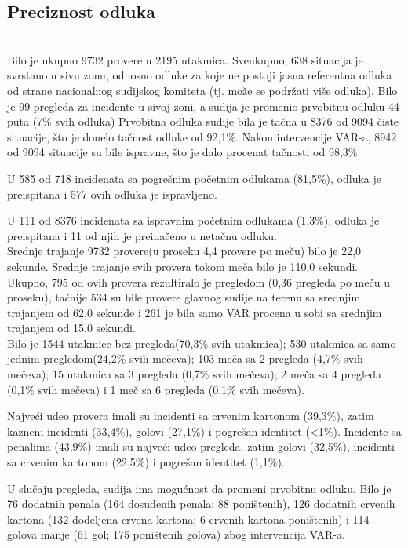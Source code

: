\documentclass[a4paper]{article}
\begin{document}
\subsection{Preciznost odluka} \\

Bilo je ukupno 9732 provere u 2195 utakmica. Sveukupno, 638 situacija je svrstano u sivu zonu, odnosno odluke za koje ne postoji jasna referentna odluka od strane nacionalnog sudijskog komiteta (tj. može se podržati više odluka). Bilo je 99 pregleda za incidente u sivoj zoni, a sudija je promenio prvobitnu odluku 44 puta (7\% svih odluka)
Prvobitna odluka sudije bila je tačna u 8376 od 9094 čiste situacije, što je donelo tačnost odluke od 92,1\%. Nakon intervencije VAR-a, 8942 od 9094 situacije su bile ispravne, što je dalo procenat tačnosti od 98,3\%.  

U 585 od 718 incidenata sa pogrešnim početnim odlukama (81,5\%), odluka je preispitana i 577 ovih odluka je ispravljeno. 

U 111 od 8376 incidenata sa ispravnim početnim odlukama (1,3\%), odluka je preispitana i 11 od njih je preinačeno u netačnu odluku. \\

Srednje trajanje 9732 provere(u proseku 4,4 provere po meču) bilo je 22,0 sekunde. Srednje trajanje svih provera tokom meča bilo je 110,0 sekundi. 
Ukupno, 795 od ovih provera rezultiralo je pregledom (0,36 pregleda po meču u proseku), tačnije 534 su bile provere glavnog sudije na terenu sa srednjim trajanjem od 62,0 sekunde i 261 je bila samo VAR procena u sobi sa srednjim trajanjem od 15,0 sekundi. \\

Bilo je 1544 utakmice bez pregleda(70,3\% svih utakmica); 530 utakmica sa samo jednim pregledom(24,2\% svih mečeva); 103 meča sa 2 pregleda (4,7\% svih mečeva); 15 utakmica sa 3 pregleda (0,7\% svih mečeva); 2 meča sa 4 pregleda (0,1\% svih mečeva) i 1 meč sa 6 pregleda (0,1\% svih mečeva).

Najveći udeo provera imali su incidenti sa crvenim kartonom (39,3\%), zatim kazneni incidenti (33,4\%), golovi (27,1\%) i pogrešan identitet (<1\%). Incidente sa penalima (43,9\%) imali su najveći udeo pregleda, zatim golovi (32,5\%), incidenti sa crvenim kartonom (22,5\%) i pogrešan identitet (1,1\%).

U slučaju pregleda, sudija ima mogućnost da promeni prvobitnu odluku. Bilo je 76 dodatnih penala (164 dosuđenih penala; 88 poništenih), 126 dodatnih crvenih kartona (132 dodeljena crvena kartona; 6 crvenih kartona poništenih) i 114 golova manje (61 gol; 175 poništenih golova) zbog intervencija VAR-a.
\end{document}
